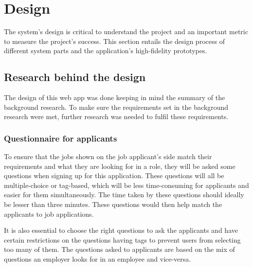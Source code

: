 \chapter{Design}
The system's design is critical to understand the project and an important metric to measure the project's success. This section entails the design process of different system parts and the application's high-fidelity prototypes.

\section{Research behind the design}
The design of this web app was done keeping in mind the summary of the background research. To make sure the requirements set in the background research were met, further research was needed to fulfil these requirements.

\subsection{Questionnaire for applicants}
To ensure that the jobs shown on the job applicant's side match their requirements and what they are looking for in a role, they will be asked some questions when signing up for this application. These questions will all be multiple-choice or tag-based, which will be less time-consuming for applicants and easier for them simultaneously. The time taken by these questions should ideally be lesser than three minutes. These questions would then help match the applicants to job applications. 

It is also essential to choose the right questions to ask the applicants and have certain restrictions on the questions having tags to prevent users from selecting too many of them. The questions asked to applicants are based on the mix of questions an employer looks for in an employee and vice-versa. \parencite{Reference28}

